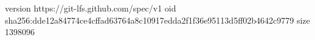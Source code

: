 version https://git-lfs.github.com/spec/v1
oid sha256:dde12a84774ce4cffad63764a8c10917edda2f1f36e95113d5ff02b4642c9779
size 1398096

